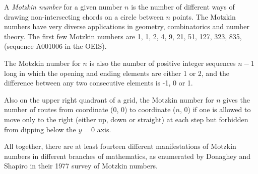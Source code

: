 \documentclass[12pt]{article}
\begin{document}
A {\em Motzkin number} for a given number $n$ is the number of different ways of drawing non-intersecting chords on a circle between $n$ points. The Motzkin numbers have very diverse applications in geometry, combinatorics and number theory. The first few Motzkin numbers are 1, 1, 2, 4, 9, 21, 51, 127, 323, 835, (sequence A001006 in the OEIS).

The Motzkin number for $n$ is also the number of positive integer sequences $n - 1$ long in which the opening and ending elements are either 1 or 2, and the difference between any two consecutive elements is -1, 0 or 1.

Also on the upper right quadrant of a grid, the Motzkin number for $n$ gives the number of routes from coordinate (0, 0) to coordinate ($n$, 0) if one is allowed to move only to the right (either up, down or straight) at each step but forbidden from dipping below the $y = 0$ axis.

All together, there are at least fourteen different manifestations of Motzkin numbers in different branches of mathematics, as enumerated by Donaghey and Shapiro in their 1977 survey of Motzkin numbers.
\end{document}
